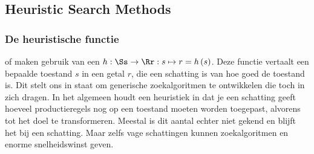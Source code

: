 \subsection{Heuristic Search Methods}
\subsubsection{De heuristische functie}
\label{sss:heuristicFunction}
 of  maken gebruik van een  $h:\Ss\rightarrow\Rr:s\mapsto r=h\left(s\right)$. Deze functie vertaalt een bepaalde toestand $s$ in een getal $r$, die een schatting is van hoe goed de toestand is. Dit stelt ons in staat om generische zoekalgoritmen te ontwikkelen die toch  in zich dragen. In het algemeen houdt een heuristiek in dat je een schatting geeft hoeveel productieregels nog op een toestand moeten worden toegepast, alvorens tot het doel te transformeren. Meestal is dit aantal echter niet gekend en blijft het bij een schatting. Maar zelfs vage schattingen kunnen zoekalgoritmen en enorme snelheidswinst geven.
